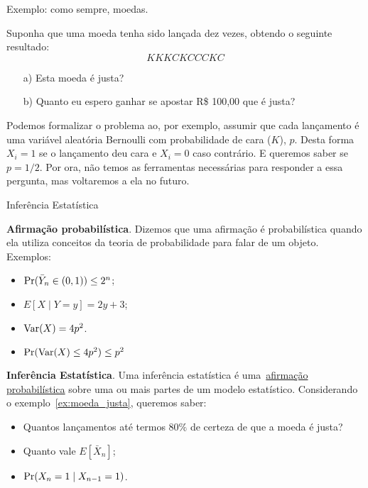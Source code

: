 \begin{frame}{Exemplo: como sempre, moedas.}
 \begin{pergunta}
 \label{ex:moeda_justa}
  Suponha que uma moeda tenha sido lançada dez vezes, obtendo o seguinte resultado:
  \begin{equation*}
   KKKCKCCCKC
  \end{equation*}
\begin{itemize}
 \item[a)] Esta moeda é justa?
 \item[b)] Quanto eu espero ganhar se apostar R\$ 100,00 que é justa? 
\end{itemize}
 \end{pergunta}
 Podemos formalizar o problema ao, por exemplo, assumir que cada lançamento é uma variável aleatória Bernoulli com probabilidade de cara ($K$), $p$.
 Desta forma $X_i = 1$ se o lançamento deu cara e $X_i = 0$ caso contrário.
 E queremos saber se $p = 1/2$.
 Por ora, não temos as ferramentas necessárias para responder a essa pergunta, mas voltaremos a ela no futuro.
\end{frame}
\begin{frame}{Inferência Estatística}
\begin{defn}
 \textbf{Afirmação probabilística}.
 Dizemos que uma afirmação é probabilística quando ela utiliza conceitos da teoria de probabilidade para falar de um objeto.
 Exemplos: 
 \begin{itemize}
  \item $\operatorname{Pr}( \bar{Y}_n \in (0, 1)) \leq 2^n$;
  \item $E[X \mid Y = y] = 2y + 3$;
  \item $\operatorname{Var}(X) = 4p^2$.
  \item $\operatorname{Pr}(\operatorname{Var}(X) \leq 4p^2 ) \leq p^2$
 \end{itemize}
\end{defn}
\begin{defn}
 \textbf{Inferência Estatística}.
 Uma inferência estatística é uma~\underline{afirmação probabilística} sobre uma ou mais partes de um modelo estatístico.
 Considerando o exemplo~\ref{ex:moeda_justa}, queremos saber:
 \begin{itemize}
  \item Quantos lançamentos até termos $80\%$ de certeza de que a moeda é justa?
  \item Quanto vale $E[\bar{X}_n]$;
  \item $\operatorname{Pr}(X_{n} = 1 \mid X_{n-1} = 1)$. 
 \end{itemize}
\end{defn}
\end{frame}
